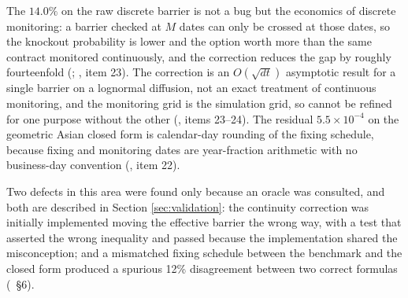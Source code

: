 \documentclass[11pt,a4paper]{article}
\begin{document}
The $14.0\%$ on the raw discrete barrier is not a bug but the economics of discrete
monitoring: a barrier checked at $M$ dates can only be crossed at those dates, so the
knockout probability is lower and the option worth more than the same contract monitored
continuously, and the correction reduces the gap by roughly fourteenfold
(; , item 23).
The correction is an $O(\sqrt{dt})$ asymptotic result for a single barrier on a lognormal
diffusion, not an exact treatment of continuous monitoring, and the monitoring grid is the
simulation grid, so  cannot be refined for one purpose without the other
(, items 23--24). The residual $5.5\times 10^{-4}$ on the geometric
Asian closed form is calendar-day rounding of the fixing schedule, because fixing and
monitoring dates are year-fraction arithmetic with no business-day convention
(, item 22).

Two defects in this area were found only because an oracle was consulted, and both are
described in Section \ref{sec:validation}: the continuity correction was initially implemented
moving the effective barrier the wrong way, with a test that asserted the wrong inequality and
passed because the implementation shared the misconception; and a mismatched fixing schedule
between the benchmark and the closed form produced a spurious 12\% disagreement between two
correct formulas (~\S6).
\end{document}
